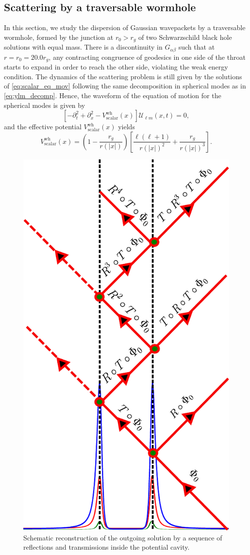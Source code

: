 \documentclass[article,aps,nofootinbib,twocolumn,superscriptaddress]{revtex4-1}
\begin{document}
\subsection{Scattering by a traversable wormhole}\label{subsec:wh} 
In this section, we study the dispersion of Gaussian wavepackets by a traversable wormhole, formed by the junction at $r_0>r_g$ of two Schwarzschild black hole solutions with equal mass. There is a discontinuity in $G_{\alpha\beta}$ such that at $r=r_0=20.0r_g$, any contracting congruence of geodesics in one side of the throat starts to expand in order to reach the other side, violating the weak energy condition.
The dynamics of the scattering problem is still given by the solutions of \eqref{eq:scalar_eq_mov} following the same decomposition in spherical modes as in \eqref{eq:ylm_decomp}. Hence, the waveform of the equation of motion for the spherical modes is given by
\begin{equation}
\left[-\partial_t^2+\partial_x^2-V^{\mathrm{wh}}_{\mathrm{scalar}}(x)\right]\mathcal{U}_{\ell m}(x,t) = 0,
\label{eq:wave_scalar_wh}
\end{equation}
and the effective potential $V^{\mathrm{wh}}_{\mathrm{scalar}}(x)$ yields
\begin{equation}
V^{\mathrm{wh}}_{\mathrm{scalar}}\left(x\right) = \left(1-\frac{r_g}{r\left(|x|\right)}\right)\left[\frac{\ell(\ell+1)}{r\left(|x|\right)^2}+\frac{r_g}{r\left(|x|\right)^3}\right].
\end{equation}   
\begin{figure}[t!]
\centering
\includegraphics[width=.3\textwidth]{figures/Geom_optics.pdf}
\caption{\label{fig:Geom_optics} Schematic reconstruction of the outgoing solution by a sequence of reflections and transmissions inside the potential cavity.}
\end{figure}
\end{document}
